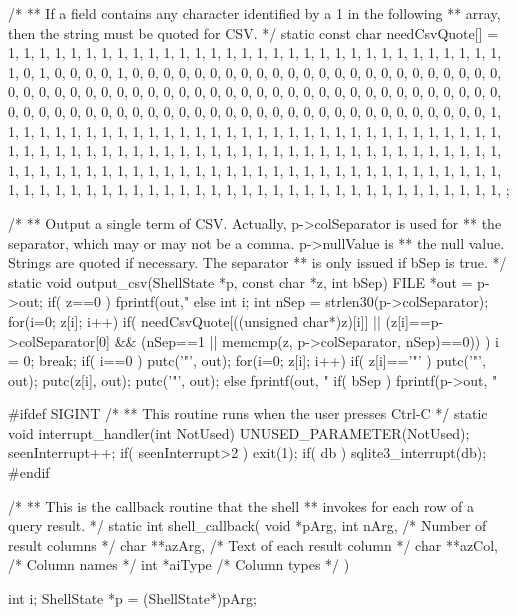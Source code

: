 \begin{Codex}[label=shell.c,numbers=left]
{/*
** If a field contains any character identified by a 1 in the following
** array, then the string must be quoted for CSV.
*/
static const char needCsvQuote[] = {
  1, 1, 1, 1, 1, 1, 1, 1,   1, 1, 1, 1, 1, 1, 1, 1,   
  1, 1, 1, 1, 1, 1, 1, 1,   1, 1, 1, 1, 1, 1, 1, 1,   
  1, 0, 1, 0, 0, 0, 0, 1,   0, 0, 0, 0, 0, 0, 0, 0, 
  0, 0, 0, 0, 0, 0, 0, 0,   0, 0, 0, 0, 0, 0, 0, 0, 
  0, 0, 0, 0, 0, 0, 0, 0,   0, 0, 0, 0, 0, 0, 0, 0, 
  0, 0, 0, 0, 0, 0, 0, 0,   0, 0, 0, 0, 0, 0, 0, 0, 
  0, 0, 0, 0, 0, 0, 0, 0,   0, 0, 0, 0, 0, 0, 0, 0, 
  0, 0, 0, 0, 0, 0, 0, 0,   0, 0, 0, 0, 0, 0, 0, 1, 
  1, 1, 1, 1, 1, 1, 1, 1,   1, 1, 1, 1, 1, 1, 1, 1,   
  1, 1, 1, 1, 1, 1, 1, 1,   1, 1, 1, 1, 1, 1, 1, 1,   
  1, 1, 1, 1, 1, 1, 1, 1,   1, 1, 1, 1, 1, 1, 1, 1,   
  1, 1, 1, 1, 1, 1, 1, 1,   1, 1, 1, 1, 1, 1, 1, 1,   
  1, 1, 1, 1, 1, 1, 1, 1,   1, 1, 1, 1, 1, 1, 1, 1,   
  1, 1, 1, 1, 1, 1, 1, 1,   1, 1, 1, 1, 1, 1, 1, 1,   
  1, 1, 1, 1, 1, 1, 1, 1,   1, 1, 1, 1, 1, 1, 1, 1,   
  1, 1, 1, 1, 1, 1, 1, 1,   1, 1, 1, 1, 1, 1, 1, 1,   
};

/*
** Output a single term of CSV.  Actually, p->colSeparator is used for
** the separator, which may or may not be a comma.  p->nullValue is
** the null value.  Strings are quoted if necessary.  The separator
** is only issued if bSep is true.
*/
static void output_csv(ShellState *p, const char *z, int bSep){
  FILE *out = p->out;
  if( z==0 ){
    fprintf(out,"%
  }else{
    int i;
    int nSep = strlen30(p->colSeparator);
    for(i=0; z[i]; i++){
      if( needCsvQuote[((unsigned char*)z)[i]] 
         || (z[i]==p->colSeparator[0] && 
             (nSep==1 || memcmp(z, p->colSeparator, nSep)==0)) ){
        i = 0;
        break;
      }
    }
    if( i==0 ){
      putc('"', out);
      for(i=0; z[i]; i++){
        if( z[i]=='"' ) putc('"', out);
        putc(z[i], out);
      }
      putc('"', out);
    }else{
      fprintf(out, "%
    }
  }
  if( bSep ){
    fprintf(p->out, "%
  }
}

#ifdef SIGINT
/*
** This routine runs when the user presses Ctrl-C
*/
static void interrupt_handler(int NotUsed){
  UNUSED_PARAMETER(NotUsed);
  seenInterrupt++;
  if( seenInterrupt>2 ) exit(1);
  if( db ) sqlite3_interrupt(db);
}
#endif

/*
** This is the callback routine that the shell
** invokes for each row of a query result.
*/
static int shell_callback(
  void *pArg,
  int nArg,        /* Number of result columns */
  char **azArg,    /* Text of each result column */
  char **azCol,    /* Column names */
  int *aiType      /* Column types */
){
  int i;
  ShellState *p = (ShellState*)pArg;

}}
\end{Codex}
